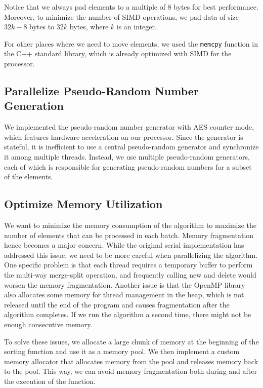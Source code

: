 \documentclass{article}
\begin{document}
Notice that we always pad elements to a multiple of 8 bytes for best performance. Moreover, to minimize the number of SIMD operations, we pad data of size $32k - 8$ bytes to $32k$ bytes, where $k$ is an integer. 

For other places where we need to move elements, we used the {\tt memcpy} function in the C++ standard library, which is already optimized with SIMD for the processor.
\subsection{Parallelize Pseudo-Random Number Generation}
We implemented the pseudo-random number generator with AES counter mode, which features hardware acceleration on our processor. Since the generator is stateful, it is inefficient to use a central pseudo-random generator and synchronize it among multiple threads. Instead, we use multiple pseudo-random generators, each of which is responsible for generating pseudo-random numbers for a subset of the elements.

\subsection{Optimize Memory Utilization}
We want to minimize the memory consumption of the algorithm to maximize the number of elements that can be processed in each batch. Memory fragmentation hence becomes a major concern. While the original serial implementation has addressed this issue, we need to be more careful when parallelizing the algorithm. One specific problem is that each thread requires a temporary buffer to perform the multi-way merge-split operation, and frequently calling new and delete would worsen the memory fragmentation. Another issue is that the OpenMP library also allocates some memory for thread management in the heap, which is not released until the end of the program and causes fragmentation after the algorithm completes. If we run the algorithm a second time, there might not be enough consecutive memory.

To solve these issues, we allocate a large chunk of memory at the beginning of the sorting function and use it as a memory pool. We then implement a custom memory allocator that allocates memory from the pool and releases memory back to the pool. This way, we can avoid memory fragmentation both during and after the execution of the function.
\end{document}
